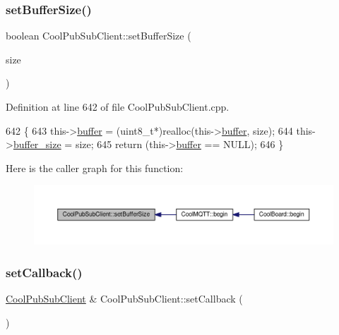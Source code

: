 \subsubsection{\texorpdfstring{set\+Buffer\+Size()}{setBufferSize()}}
{\footnotesize\ttfamily boolean Cool\+Pub\+Sub\+Client\+::set\+Buffer\+Size (\begin{DoxyParamCaption}\item[{uint16\+\_\+t}]{size }\end{DoxyParamCaption})}



Definition at line 642 of file Cool\+Pub\+Sub\+Client.\+cpp.


\begin{DoxyCode}
642                                                      \{
643   this->\hyperlink{class_cool_pub_sub_client_a7e8bcc6096626916046a51bebadc7851}{buffer} = (uint8\_t*)realloc(this->\hyperlink{class_cool_pub_sub_client_a7e8bcc6096626916046a51bebadc7851}{buffer}, size);
644   this->\hyperlink{class_cool_pub_sub_client_ae6cb10e42c057483d53516ac830ab526}{buffer\_size} = size;
645   \textcolor{keywordflow}{return} (this->\hyperlink{class_cool_pub_sub_client_a7e8bcc6096626916046a51bebadc7851}{buffer} == NULL);
646 \}
\end{DoxyCode}
Here is the caller graph for this function\+:\nopagebreak
\begin{figure}[H]
\begin{center}
\leavevmode
\includegraphics[width=350pt]{d8/d4b/class_cool_pub_sub_client_a4f83e54f1ba96e32f725d93cdec283b7_icgraph}
\end{center}
\end{figure}
\mbox{\label{class_cool_pub_sub_client_ac5cab7658f1bdded32131241e468e661}} 
\subsubsection{\texorpdfstring{set\+Callback()}{setCallback()}}
{\footnotesize\ttfamily \hyperlink{class_cool_pub_sub_client}{Cool\+Pub\+Sub\+Client} \& Cool\+Pub\+Sub\+Client\+::set\+Callback (\begin{DoxyParamCaption}\item[{\hyperlink{class_cool_pub_sub_client_a021ec75e9fbaf658370b8005ccfddc14}{M\+Q\+T\+T\+\_\+\+C\+A\+L\+L\+B\+A\+C\+K\+\_\+\+S\+I\+G\+N\+A\+T\+U\+RE}}]{ }\end{DoxyParamCaption})}



